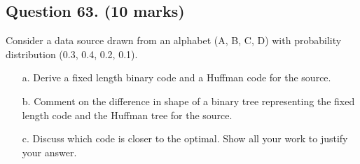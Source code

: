 \subsection*{Question 63. (10 marks) } Consider a data source drawn from an alphabet (A, B, C, D) with probability
distribution (0.3, 0.4, 0.2, 0.1).
\begin{itemize}
	\item[a.] Derive a fixed length binary code and a Huffman code for the source.
	\item[b.] Comment on the difference in shape of a binary tree representing the fixed
	length code and the Huffman tree for the source.
	\item[c.] Discuss which code is closer to the optimal. Show all your work to justify your
	answer.
\end{itemize}


